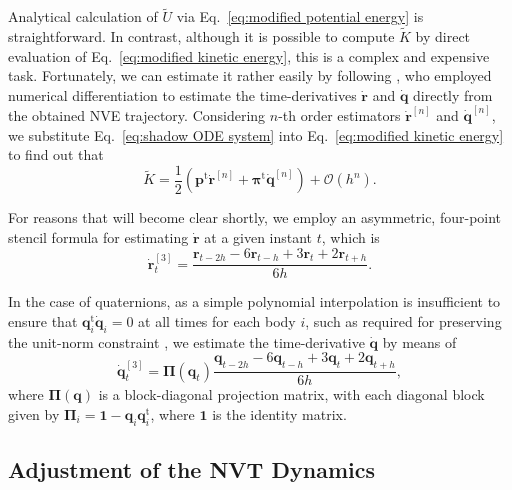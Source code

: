 \documentclass[
journal=jctcce,
layout=twocolumn
]{achemso}
\newcommand{\mt}[1]{\boldsymbol{\mathbf{#1}}}   %
\newcommand{\vt}[1]{\boldsymbol{\mathbf{#1}}}   %
\newcommand{\tr}[1]{#1^\text{t}}                %
\newcommand{\timestep}{h}
\newcommand{\refined}[1]{\widetilde{#1}}
\begin{document}
Analytical calculation of $\refined U$ via Eq.~\eqref{eq:modified potential energy} is straightforward.
In contrast, although it is possible to compute $\refined K$ by direct evaluation of Eq.~\eqref{eq:modified kinetic energy}, this is a complex and expensive task.
Fortunately, we can estimate it rather easily by following \citeauthor{Eastwood_2010} \cite{Eastwood_2010}, who employed numerical differentiation to estimate the time-derivatives $\dot{\vt r}$ and $\dot{\vt q}$ directly from the obtained NVE trajectory.
Considering $n$-th order estimators $\dot{\vt r}^{[n]}$ and $\dot{\vt q}^{[n]}$, we substitute Eq.~\eqref{eq:shadow ODE system} into Eq.~\eqref{eq:modified kinetic energy} to find out that
\begin{equation}
\label{eq:modified kinetic energy estimator}
\refined K = \frac{1}{2} \left( \tr{\vt p} \dot{\vt r}^{[n]} + \tr{\vt \pi} \dot{\vt q}^{[n]} \right) + \mathcal{O}(h^n).
\end{equation}

For reasons that will become clear shortly, we employ an asymmetric, four-point stencil formula for estimating $\dot{\vt r}$ at a given instant $t$, which is
\begin{equation*}
\dot{\vt r}^{[3]}_t = \frac{{\vt r}_{t-2\timestep} - 6 {\vt r}_{t-\timestep} + 3 {\vt r}_t + 2 {\vt r}_{t+\timestep}}{6\timestep}.
\end{equation*}

In the case of quaternions, as a simple polynomial interpolation is insufficient to ensure that $\tr{\vt q}_i \dot{\vt q}_i = 0$ at all times for each body $i$, such as required for preserving the unit-norm constraint \cite{Silveira_2017}, we estimate the time-derivative $\dot{\vt q}$ by means of \cite{Schay_1995}
\begin{equation*}
\dot{\vt q}^{[3]}_t = {\mt \Pi}({\vt q}_t) \frac{{\vt q}_{t-2\timestep} - 6 {\vt q}_{t-\timestep} + 3 {\vt q}_t + 2 {\vt q}_{t+\timestep}}{6\timestep},
\end{equation*}
where ${\mt \Pi}(\vt q)$ is a block-diagonal projection matrix, with each diagonal block given by ${\mt \Pi}_i = {\mt 1} - {\vt q}_i \tr{\vt q}_i$, where $\mt 1$ is the identity matrix.

\subsection{Adjustment of the NVT Dynamics}
\label{sec:refined_method}
\end{document}
